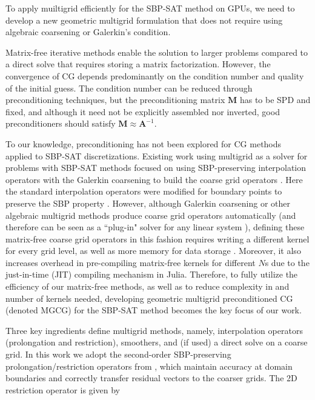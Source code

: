 
To apply muiltigrid efficiently for the SBP-SAT method on GPUs, we need to develop a new geometric multigrid formulation that does not require using algebraic coarsening or Galerkin's condition.

Matrix-free iterative methods enable the solution to larger problems compared to a direct solve that requires storing a matrix factorization.  However, the convergence of CG depends predominantly on the condition number and quality of the initial guess. The condition number can be reduced through preconditioning techniques, but the preconditioning matrix $\mathbf{M}$ has to be SPD and fixed, and although it need not be explicitly assembled nor inverted, good preconditioners should satisfy $\mathbf{M} \approx \mathbf{A}^{-1}$. 


To our knowledge, preconditioning has not been explored for CG methods applied to SBP-SAT discretizations. 
Existing work using multigrid as a solver for problems with SBP-SAT methods focused on using SBP-preserving interpolation operators with the Galerkin coarsening to build the coarse grid operators \citep{Ruggiu2018}. Here the standard interpolation operators were modified for boundary points to preserve the SBP property \citep{Ruggiu2018}. However, although Galerkin coarsening or other algebraic multigrid methods produce coarse grid operators automatically (and therefore can be seen as a ``plug-in" solver for any linear system \citep{stuben2001review}), defining these matrix-free coarse grid operators in this fashion requires writing a different kernel for every grid level, as well as more memory for data storage \citep{brandt2006guide}. 
Moreover, it also increases overhead in pre-compiling matrix-free kernels for different $N$s due to the just-in-time (JIT) compiling mechanism in Julia. Therefore, to fully utilize the efficiency of our matrix-free methods, as well as to reduce complexity in and number of kernels needed, developing geometric multigrid preconditioned CG (denoted MGCG) for the SBP-SAT method becomes the key focus of our work. 

Three key ingredients define multigrid methods, namely, interpolation operators (prolongation and restriction), smoothers, and (if used) a direct solve on a coarse grid.  In this work we adopt the second-order SBP-preserving prolongation/restriction operators from \citep{Ruggiu2018}, which maintain accuracy at domain boundaries and correctly transfer residual vectors to the coarser grids. The 2D restriction operator is given by

